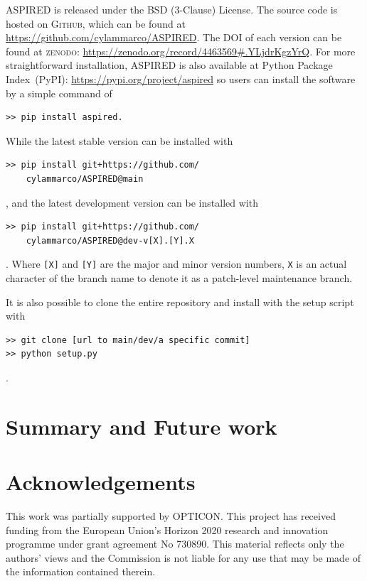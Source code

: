\documentclass[linenumbers, twocolumn]{aastex631}
\begin{document}
\textsc{ASPIRED} is released under the BSD (3-Clause) License. The
source code is hosted on \textsc{Github}, which can be found at
\url{https://github.com/cylammarco/ASPIRED}. The DOI of each version
can be found at \textsc{zenodo}: \url{https://zenodo.org/record/4463569#.YLjdrKgzYrQ}.
For more straightforward installation, \textsc{ASPIRED} is also available at Python
Package Index~(PyPI): \url{https://pypi.org/project/aspired} so
users can install the software by a simple command of 
\begin{verbatim}
>> pip install aspired.
\end{verbatim}
While the latest stable version can be installed with
\begin{verbatim}
>> pip install git+https://github.com/
    cylammarco/ASPIRED@main
\end{verbatim},
and the latest development version can be installed with 
\begin{verbatim}
>> pip install git+https://github.com/
    cylammarco/ASPIRED@dev-v[X].[Y].X
\end{verbatim}. Where \verb+[X]+ and \verb+[Y]+ are the major and minor version numbers,
\verb+X+ is an actual character of the branch name to denote it as a patch-level maintenance
branch.

It is also possible to clone the entire repository
and install with the setup script with
\begin{verbatim}
>> git clone [url to main/dev/a specific commit]
>> python setup.py
\end{verbatim}
.

\section{Summary and Future work}
\label{sec:summary}

\section*{Acknowledgements}
This work was partially supported by OPTICON. This project has
received funding from the European Union's Horizon 2020 research and
innovation programme under grant agreement No 730890. This material
reflects only the authors' views and the Commission is not liable for
any use that may be made of the information contained therein.
\end{document}

